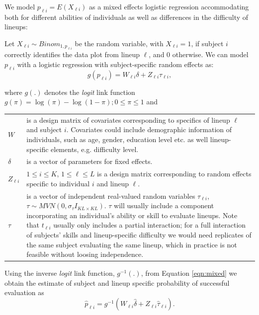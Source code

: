 \documentclass{article}
\newcommand{\hh}[1]{{\color{orange} #1}} %
\begin{document}
\hh{
We model $p_{\ell i} = E(X_{\ell i})$ as  a mixed effects logistic regression
 accommodating both for different abilities of individuals as well as differences in the difficulty of lineups: 


Let $X_{\ell i} \sim Binom_{1, p_{\ell i}}$ be the random variable, with $X_{ \ell i}= 1$, if  subject $i$ correctly identifies the data plot from lineup $\ell$, and 0 otherwise.
We can model $p_{ \ell i}$ with a logistic regression with subject-specific random effects as:
\begin{equation} \label{eqn:mixed}
g( p_{\ell i} )= W_{\ell i} \delta +  Z_{\ell i}  \tau_{\ell i},  
\end{equation}

where $g(.)$ denotes the {\it logit} link function $g(\pi)=\log(\pi) - \log(1-\pi); 0 \le \pi \le 1$ and

\begin{tabular}{lp{5.5in}}
$W$  & is a design matrix of covariates corresponding to specifics of lineup $\ell$ and subject $i$. Covariates could include  demographic information of individuals, such as age, gender, education level etc. as well lineup-specific elements, e.g. difficulty level. \\
$\delta$ & is a vector of parameters for fixed effects.\\
$Z_{\ell i}$ & $1 \le i \le K$, $1 \le \ell \le L$  is a design matrix corresponding to random effects specific to individual $i$ and lineup $\ell$.  \\
$\tau$ & is a vector of independent real-valued random variables $\tau_{\ell i}$,  $\tau  \sim  MVN(0,\sigma_\tau I_{KL \times KL})$. $\tau$ will usually include a component incorporating an individual's ability or skill to evaluate lineups. 
Note that $t_{\ell i }$ usually only includes a partial interaction; for a full interaction of subjects' skills and lineup-specific difficulty we would need replicates of the same subject evaluating the same lineup, which in practice is not feasible without loosing independence.\\
\end{tabular}
}

Using the inverse {\it logit} link function, $g^{-1}(.)$, from  Equation \ref{eqn:mixed} we obtain the estimate of subject and lineup specific probability of successful evaluation as 
\begin{equation} \label{eqn:mixed_power}
\hat p_{\ell i} =  g^{-1}(W_{\ell i} \hat {\delta} +  Z_{\ell i}  \hat {\tau}_{\ell i}).
\end{equation}
\end{document}

